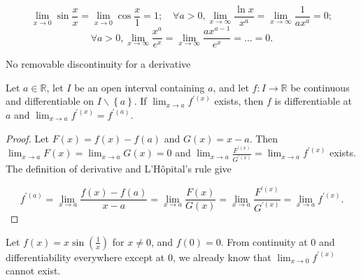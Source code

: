 \begin{example}

\[\lim\limits_{x\rightarrow 0}\sin\frac{x}{x} = \lim\limits_{x\rightarrow 0}\cos\frac{x}{1} = 1;\quad\forall a > 0,\lim\limits_{x\rightarrow\infty}\frac{\ln x}{x^{a}} = \lim\limits_{x\rightarrow\infty}\frac{1}{ax^{a}} = 0;\]\[\forall a > 0,\lim\limits_{x\rightarrow\infty}\frac{x^{a}}{e^{x}} = \lim\limits_{x\rightarrow\infty}\frac{ax^{a - 1}}{e^{x}} = \ldots = 0.\]

\end{example}

\begin{corollary}{No removable discontinuity for a derivative}

Let \(a \in \mathbb{R}\), let \(I\) be an open interval containing \(a\), and let \(f:I\rightarrow\mathbb{R}\) be continuous and differentiable on \(I \smallsetminus \left\{ a \right\}\). If \(\lim_{x\rightarrow a}f^{'{(x)}}\) exists, then \(f\) is differentiable at \(a\) and \(\lim_{x\rightarrow a}f^{'{(x)}} = f^{'{(a)}}\).

\end{corollary}

\begin{proof}

Let \(F(x) = f(x) - f(a)\) and \(G(x) = x - a\). Then \(\lim_{x\rightarrow a}F(x) = \lim_{x\rightarrow a}G(x) = 0\) and \(\lim_{x\rightarrow a}\frac{F^{'{(x)}}}{G^{'{(x)}}} = \lim_{x\rightarrow a}f^{'{(x)}}\) exists. The definition of derivative and L'Hôpital's rule give

\[f^{'{(a)}} = \lim\limits_{x\rightarrow a}\frac{f(x) - f(a)}{x - a} = \lim\limits_{x\rightarrow a}\frac{F(x)}{G(x)} = \lim\limits_{x\rightarrow a}\frac{F^{'{(x)}}}{G^{'{(x)}}} = \lim\limits_{x\rightarrow a}f^{'{(x)}}.\]

\end{proof}

\begin{example}

Let \(f(x) = x\sin\left( \frac{1}{x} \right)\) for \(x \neq 0\), and \(f(0) = 0\). From continuity at \(0\) and differentiability everywhere except at \(0\), we already know that \(\lim_{x\rightarrow 0}f^{'{(x)}}\) cannot exist.

\end{example}
